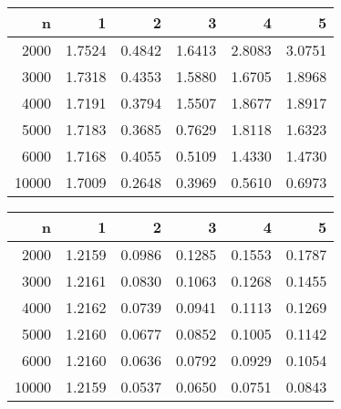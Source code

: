 \begin{table}[ht]
\centering
\begin{tabular}{rrrrrr}
  \hline
n & 1 & 2 & 3 & 4 & 5 \\ 
  \hline
2000 & 1.7524 & 0.4842 & 1.6413 & 2.8083 & 3.0751 \\ 
  3000 & 1.7318 & 0.4353 & 1.5880 & 1.6705 & 1.8968 \\ 
  4000 & 1.7191 & 0.3794 & 1.5507 & 1.8677 & 1.8917 \\ 
  5000 & 1.7183 & 0.3685 & 0.7629 & 1.8118 & 1.6323 \\ 
  6000 & 1.7168 & 0.4055 & 0.5109 & 1.4330 & 1.4730 \\ 
  10000 & 1.7009 & 0.2648 & 0.3969 & 0.5610 & 0.6973 \\ 
   \hline
\end{tabular}
\end{table}
\begin{table}[ht]
\centering
\begin{tabular}{rrrrrr}
  \hline
n & 1 & 2 & 3 & 4 & 5 \\ 
  \hline
2000 & 1.2159 & 0.0986 & 0.1285 & 0.1553 & 0.1787 \\ 
  3000 & 1.2161 & 0.0830 & 0.1063 & 0.1268 & 0.1455 \\ 
  4000 & 1.2162 & 0.0739 & 0.0941 & 0.1113 & 0.1269 \\ 
  5000 & 1.2160 & 0.0677 & 0.0852 & 0.1005 & 0.1142 \\ 
  6000 & 1.2160 & 0.0636 & 0.0792 & 0.0929 & 0.1054 \\ 
  10000 & 1.2159 & 0.0537 & 0.0650 & 0.0751 & 0.0843 \\ 
   \hline
\end{tabular}
\end{table}
